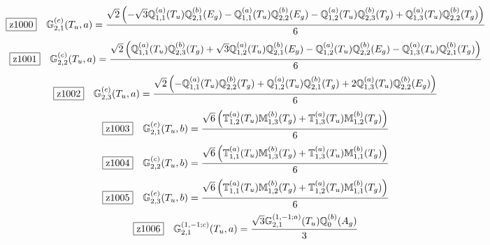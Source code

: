 \documentclass[fleqn,10pt,landscape]{jsarticle}
\begin{document}
\begin{dmath*}
\hspace*{3mm}\fbox{z1000}\quad \mathbb{G}_{2,1}^{(c)}(T_{u},a)=\frac{\sqrt{2} \left(- \sqrt{3} \mathbb{Q}_{1,1}^{(a)}(T_{u}) \mathbb{Q}_{2,1}^{(b)}(E_{g}) - \mathbb{Q}_{1,1}^{(a)}(T_{u}) \mathbb{Q}_{2,2}^{(b)}(E_{g}) - \mathbb{Q}_{1,2}^{(a)}(T_{u}) \mathbb{Q}_{2,3}^{(b)}(T_{g}) + \mathbb{Q}_{1,3}^{(a)}(T_{u}) \mathbb{Q}_{2,2}^{(b)}(T_{g})\right)}{6}
\end{dmath*}
\begin{dmath*}
\hspace*{3mm}\fbox{z1001}\quad \mathbb{G}_{2,2}^{(c)}(T_{u},a)=\frac{\sqrt{2} \left(\mathbb{Q}_{1,1}^{(a)}(T_{u}) \mathbb{Q}_{2,3}^{(b)}(T_{g}) + \sqrt{3} \mathbb{Q}_{1,2}^{(a)}(T_{u}) \mathbb{Q}_{2,1}^{(b)}(E_{g}) - \mathbb{Q}_{1,2}^{(a)}(T_{u}) \mathbb{Q}_{2,2}^{(b)}(E_{g}) - \mathbb{Q}_{1,3}^{(a)}(T_{u}) \mathbb{Q}_{2,1}^{(b)}(T_{g})\right)}{6}
\end{dmath*}
\begin{dmath*}
\hspace*{3mm}\fbox{z1002}\quad \mathbb{G}_{2,3}^{(c)}(T_{u},a)=\frac{\sqrt{2} \left(- \mathbb{Q}_{1,1}^{(a)}(T_{u}) \mathbb{Q}_{2,2}^{(b)}(T_{g}) + \mathbb{Q}_{1,2}^{(a)}(T_{u}) \mathbb{Q}_{2,1}^{(b)}(T_{g}) + 2 \mathbb{Q}_{1,3}^{(a)}(T_{u}) \mathbb{Q}_{2,2}^{(b)}(E_{g})\right)}{6}
\end{dmath*}
\begin{dmath*}
\hspace*{3mm}\fbox{z1003}\quad \mathbb{G}_{2,1}^{(c)}(T_{u},b)=\frac{\sqrt{6} \left(\mathbb{T}_{1,2}^{(a)}(T_{u}) \mathbb{M}_{1,3}^{(b)}(T_{g}) + \mathbb{T}_{1,3}^{(a)}(T_{u}) \mathbb{M}_{1,2}^{(b)}(T_{g})\right)}{6}
\end{dmath*}
\begin{dmath*}
\hspace*{3mm}\fbox{z1004}\quad \mathbb{G}_{2,2}^{(c)}(T_{u},b)=\frac{\sqrt{6} \left(\mathbb{T}_{1,1}^{(a)}(T_{u}) \mathbb{M}_{1,3}^{(b)}(T_{g}) + \mathbb{T}_{1,3}^{(a)}(T_{u}) \mathbb{M}_{1,1}^{(b)}(T_{g})\right)}{6}
\end{dmath*}
\begin{dmath*}
\hspace*{3mm}\fbox{z1005}\quad \mathbb{G}_{2,3}^{(c)}(T_{u},b)=\frac{\sqrt{6} \left(\mathbb{T}_{1,1}^{(a)}(T_{u}) \mathbb{M}_{1,2}^{(b)}(T_{g}) + \mathbb{T}_{1,2}^{(a)}(T_{u}) \mathbb{M}_{1,1}^{(b)}(T_{g})\right)}{6}
\end{dmath*}
\begin{dmath*}
\hspace*{3mm}\fbox{z1006}\quad \mathbb{G}_{2,1}^{(1,-1;c)}(T_{u},a)=\frac{\sqrt{3} \mathbb{G}_{2,1}^{(1,-1;a)}(T_{u}) \mathbb{Q}_{0}^{(b)}(A_{g})}{3}
\end{dmath*}
\end{document}
